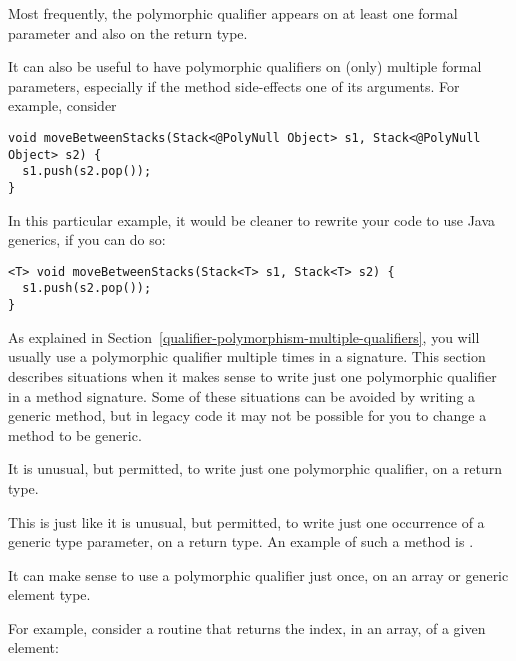 Most frequently, the polymorphic qualifier appears on at least one formal
parameter and also on the return type.



  It can also be useful to have
polymorphic qualifiers on (only) multiple formal parameters, especially if
the method side-effects one of its arguments.
For example, consider

\begin{Verbatim}
void moveBetweenStacks(Stack<@PolyNull Object> s1, Stack<@PolyNull Object> s2) {
  s1.push(s2.pop());
}
\end{Verbatim}

\noindent
In this particular example, it would be cleaner to rewrite your code to use
Java generics, if you can do so:

\begin{Verbatim}
<T> void moveBetweenStacks(Stack<T> s1, Stack<T> s2) {
  s1.push(s2.pop());
}
\end{Verbatim}



As explained in Section~\ref{qualifier-polymorphism-multiple-qualifiers},
you will usually use a polymorphic qualifier
multiple times in a signature.
This section describes situations when it makes sense to write just one
polymorphic qualifier in a method signature.
Some of these situations can be avoided by writing a generic method,
but in legacy code it may not be possible for you to change a method to be
generic.



It is unusual, but permitted, to write just one polymorphic qualifier, on a return type.

This is just like it is unusual, but permitted, to write just one
occurrence of a generic type parameter, on a return type.  An example of
such a method is
.



It can make sense to use a polymorphic qualifier just once, on an array or
generic element type.

For example, consider a routine that returns the index, in an array, of a
given element:

